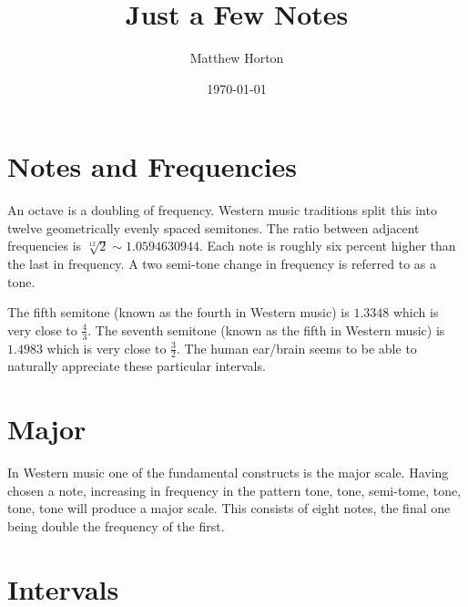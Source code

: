\documentclass[a4paper]{scrartcl}
\title{Just a Few Notes}
\author{Matthew Horton}
\date{\today}
\begin{document}
\maketitle
\section{Notes and Frequencies}
An octave is a doubling of frequency. Western music traditions split this into twelve geometrically evenly spaced semitones. The ratio between adjacent frequencies is $\sqrt[12]{2} \sim 1.0594630944$. Each note is roughly six percent higher than the last in frequency. A two semi-tone change in frequency is referred to as a tone.

The fifth semitone (known as the fourth in Western music) is $1.3348$ which is very close to $\frac{4}{3}$. 
The seventh semitone (known as the fifth in Western music) is $1.4983$ which is very close to $\frac{3}{2}$. The human ear/brain seems to be able to naturally appreciate these particular intervals.

\section{Major}
In Western music one of the fundamental constructs is the major scale. Having chosen a note, increasing in frequency in the pattern tone, tone, semi-tome, tone, tone, tone will produce a major scale. This consists of eight notes, the final one being double the frequency of the first. 

\section{Intervals}
\end{document}
